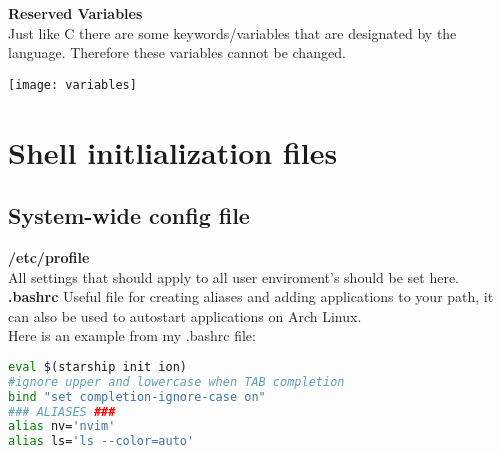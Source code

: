 \documentclass[12pt, letterpaper]{report}
\begin{document}
\textbf{Reserved Variables}\\
Just like C there are some keywords/variables that are designated by the language.
Therefore these variables cannot be changed.
\begin{center}
\texttt{[image: variables]}
\end{center}

\section{Shell initlialization files}
\subsection{System-wide config file}

\textbf{/etc/profile}\\
All settings that should apply to all user enviroment's should be set here. \\

\textbf{.bashrc}
Useful file for creating aliases and adding applications to your path, it can 
also be used to autostart applications on Arch Linux.\\
Here is an example from my .bashrc file:
\begin{lstlisting}[language=Bash,framexleftmargin=5mm,frame=single,xleftmargin=18pt]
eval $(starship init ion)
#ignore upper and lowercase when TAB completion
bind "set completion-ignore-case on"
### ALIASES ###
alias nv='nvim'
alias ls='ls --color=auto'
\end{lstlisting}
\end{document}
